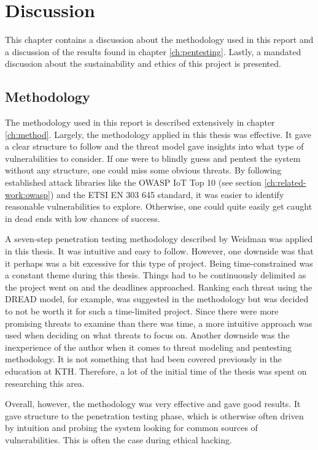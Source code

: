 \chapter{Discussion} \label{ch:discussion}
This chapter contains a discussion about the methodology used in this report and a discussion of the results found in chapter \ref{ch:pentesting}. Lastly, a mandated discussion about the sustainability and ethics of this project is presented.

\section{Methodology}
The methodology used in this report is described extensively in chapter \ref{ch:method}. Largely, the methodology applied in this thesis was effective. It gave a clear structure to follow and the threat model gave insights into what type of vulnerabilities to consider. If one were to blindly guess and pentest the system without any structure, one could miss some obvious threats. By following established attack libraries like the OWASP IoT Top 10 \cite{owasp-iot-top10} (see section \ref{ch:related-work:owasp}) and the ETSI EN 303 645 standard, it was easier to identify reasonable vulnerabilities to explore. Otherwise, one could quite easily get caught in dead ends with low chances of success.

A seven-step penetration testing methodology described by Weidman \cite{weidman2014} was applied in this thesis. It was intuitive and easy to follow. However, one downside was that it perhaps was a bit excessive for this type of project. Being time-constrained was a constant theme during this thesis. Things had to be continuously delimited as the project went on and the deadlines approached. Ranking each threat using the DREAD model, for example, was suggested in the methodology but was decided to not be worth it for such a time-limited project. Since there were more promising threats to examine than there was time, a more intuitive approach was used when deciding on what threats to focus on. Another downside was the inexperience of the author when it comes to threat modeling and pentesting methodology. It is not something that had been covered previously in the education at KTH. Therefore, a lot of the initial time of the thesis was spent on researching this area.

Overall, however, the methodology was very effective and gave good results. It gave structure to the penetration testing phase, which is otherwise often driven by intuition and probing the system looking for common sources of vulnerabilities. This is often the case during ethical hacking.

